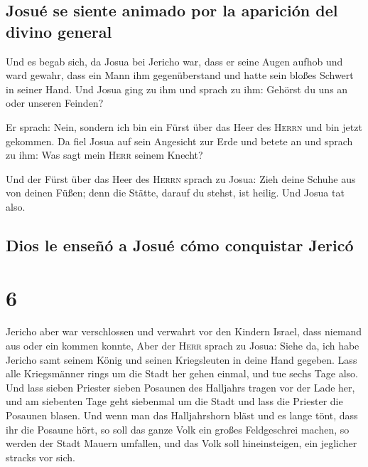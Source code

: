 \hypertarget{josuuxe9-se-siente-animado-por-la-apariciuxf3n-del-divino-general}{%
\subsection{Josué se siente animado por la aparición del divino
general}\label{josuuxe9-se-siente-animado-por-la-apariciuxf3n-del-divino-general}}

 Und es begab sich, da Josua bei Jericho war, dass er
seine Augen aufhob und ward gewahr, dass ein Mann ihm gegenüberstand und
hatte sein bloßes Schwert in seiner Hand. Und Josua ging zu ihm und
sprach zu ihm: Gehörst du uns an oder unseren Feinden?

 Er sprach: Nein, sondern ich bin ein Fürst über das Heer
des \textsc{Herrn} und bin jetzt gekommen. Da fiel Josua auf sein
Angesicht zur Erde und betete an und sprach zu ihm: Was sagt mein
\textsc{Herr} seinem Knecht?

 Und der Fürst über das Heer des \textsc{Herrn} sprach zu
Josua: Zieh deine Schuhe aus von deinen Füßen; denn die Stätte, darauf
du stehst, ist heilig. Und Josua tat also.

\hypertarget{dios-le-enseuxf1uxf3-a-josuuxe9-cuxf3mo-conquistar-jericuxf3}{%
\subsection{Dios le enseñó a Josué cómo conquistar
Jericó}\label{dios-le-enseuxf1uxf3-a-josuuxe9-cuxf3mo-conquistar-jericuxf3}}

\hypertarget{section-5}{%
\section{6}\label{section-5}}

 Jericho aber war verschlossen und verwahrt vor den
Kindern Israel, dass niemand aus oder ein kommen konnte, 
Aber der \textsc{Herr} sprach zu Josua: Siehe da, ich habe Jericho samt
seinem König und seinen Kriegsleuten in deine Hand gegeben.
 Lass alle Kriegsmänner rings um die Stadt her gehen
einmal, und tue sechs Tage also.  Und lass sieben Priester
sieben Posaunen des Halljahrs tragen vor der Lade her, und am siebenten
Tage geht siebenmal um die Stadt und lass die Priester die Posaunen
blasen.  Und wenn man das Halljahrshorn bläst und es lange
tönt, dass ihr die Posaune hört, so soll das ganze Volk ein großes
Feldgeschrei machen, so werden der Stadt Mauern umfallen, und das Volk
soll hineinsteigen, ein jeglicher stracks vor sich.

